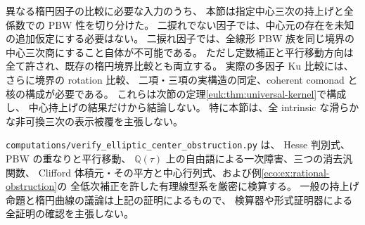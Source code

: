 異なる楕円因子の比較に必要な入力のうち、
本節は指定中心三次の持上げと全係数での PBW 性を切り分けた。
二捩れでない因子では、中心元の存在を未知の追加仮定にする必要はない。
二捩れ因子では、全線形 PBW 族を同じ境界の中心三次商にすること自体が不可能である。
ただし定数補正と平行移動方向は全て許され、既存の楕円境界比較とも両立する。
実際の多因子 Ku 比較には、さらに境界の rotation 比較、
二項・三項の実構造の同定、coherent comonad と核の構成が必要である。
これらは次節の定理\ref{euk:thm:universal-kernel}で構成し、
中心持上げの結果だけから結論しない。
特に本節は、全 intrinsic な滑らかな非可換三次の表示被覆を主張しない。

\texttt{computations/verify\_elliptic\_center\_obstruction.py} は、
Hesse 判別式、PBW の重なりと平行移動、
$\mathbb Q(\tau)$ 上の自由語による一次障害、三つの消去汎関数、
Clifford 体積元・その平方と中心行列式、および例\ref{eco:ex:rational-obstruction}の
全低次補正を許した有理線型系を厳密に検算する。
一般の持上げ命題と楕円曲線の議論は上記の証明によるもので、
検算器や形式証明器による全証明の確認を主張しない。

